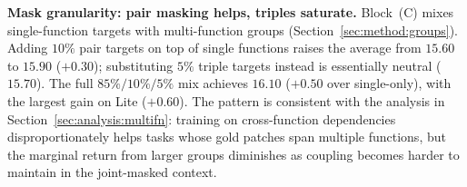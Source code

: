 \textbf{Mask granularity: pair masking helps, triples saturate.}
Block~(C) mixes single-function targets with multi-function groups
(Section~\ref{sec:method:groups}). Adding $10\%$ pair targets on top of
single functions raises the average from $15.60$ to $15.90$ ($+0.30$);
substituting $5\%$ triple targets instead is essentially neutral
($15.70$). The full $85\%/10\%/5\%$ mix achieves $16.10$ ($+0.50$ over
single-only), with the largest gain on Lite ($+0.60$). The pattern is
consistent with the analysis in Section~\ref{sec:analysis:multifn}:
training on cross-function dependencies disproportionately helps tasks
whose gold patches span multiple functions, but the marginal return
from larger groups diminishes as coupling becomes harder to maintain in
the joint-masked context.
